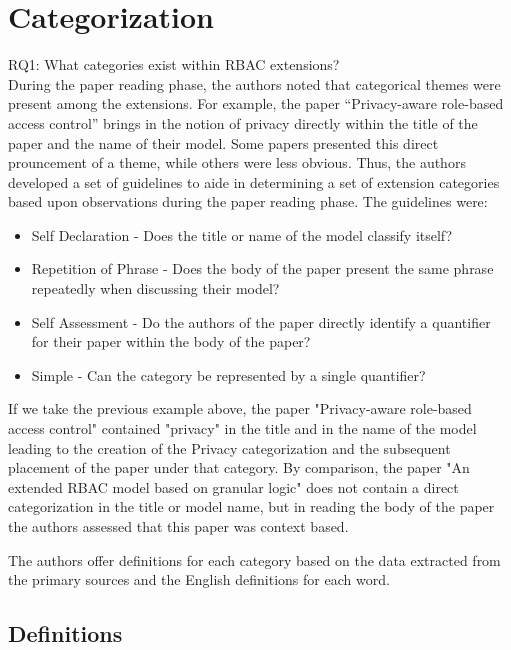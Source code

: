 \section{Categorization} \label{sec:categorization}

RQ1: What categories exist within RBAC extensions? \\

During the paper reading phase, the authors noted that categorical themes were present among the extensions. 
For example, the paper ``Privacy-aware role-based access control'' \cite{ni2010privacy} brings in the notion of privacy directly within the title of the paper and the name of their model. 
Some papers presented this direct prouncement of a theme, while others were less obvious. 
Thus, the authors developed a set of guidelines to aide in determining a set of extension categories based upon observations during the paper reading phase. The guidelines were:

\begin{itemize}
\item Self Declaration - Does the title or name of the model classify itself?
\item Repetition of Phrase - Does the body of the paper present the same phrase repeatedly when discussing their model?
\item Self Assessment - Do the authors of the paper directly identify a quantifier for their paper within the body of the paper?
\item Simple - Can the category be represented by a single quantifier?
\end{itemize}

If we take the previous example above, the paper "Privacy-aware role-based access control" \cite{ni2010privacy} contained "privacy" in
the title and in the name of the model leading to the creation of the Privacy categorization and the subsequent placement of the paper under that category.
By comparison, the paper "An extended RBAC model based on granular logic" \cite{jian2008extended} does not contain a direct categorization in the title or model name, but in reading the body of the paper the authors assessed that this paper was context based.  

The authors offer definitions for each category based on the data extracted from the primary sources and the English definitions for each word.

\subsection{Definitions}

